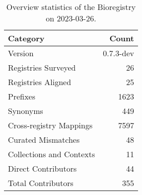 \begin{table}
\centering
\caption{Overview statistics of the Bioregistry on 2023-03-26.}
\label{tab:bioregistry-summary}
\begin{tabular}{lr}
\toprule
                Category &     Count \\
\midrule
                 Version & 0.7.3-dev \\
     Registries Surveyed &        26 \\
      Registries Aligned &        25 \\
                Prefixes &      1623 \\
                Synonyms &       449 \\
 Cross-registry Mappings &      7597 \\
      Curated Mismatches &        48 \\
Collections and Contexts &        11 \\
     Direct Contributors &        44 \\
      Total Contributors &       355 \\
\bottomrule
\end{tabular}
\end{table}

